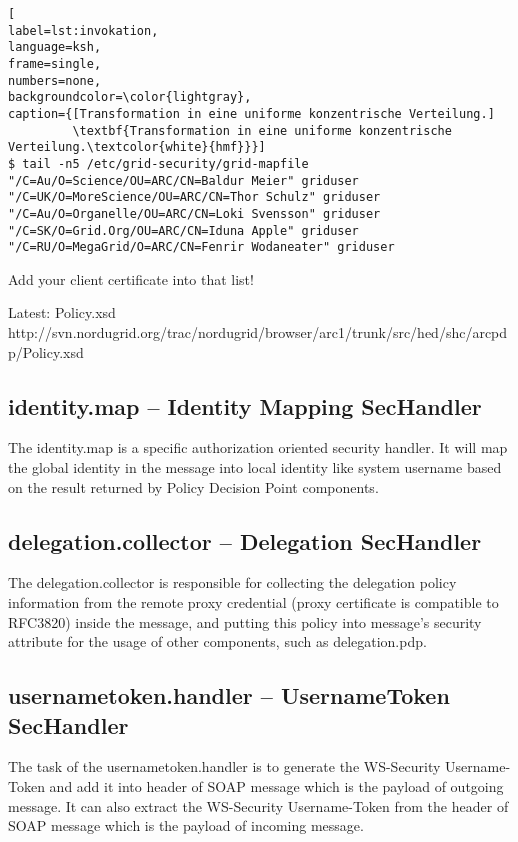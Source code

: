\begin{lstlisting}[
label=lst:invokation,
language=ksh,
frame=single,
numbers=none,
backgroundcolor=\color{lightgray},
caption={[Transformation in eine uniforme konzentrische Verteilung.]
         \textbf{Transformation in eine uniforme konzentrische Verteilung.\textcolor{white}{hmf}}}]
$ tail -n5 /etc/grid-security/grid-mapfile
"/C=Au/O=Science/OU=ARC/CN=Baldur Meier" griduser
"/C=UK/O=MoreScience/OU=ARC/CN=Thor Schulz" griduser
"/C=Au/O=Organelle/OU=ARC/CN=Loki Svensson" griduser
"/C=SK/O=Grid.Org/OU=ARC/CN=Iduna Apple" griduser
"/C=RU/O=MegaGrid/O=ARC/CN=Fenrir Wodaneater" griduser
\end{lstlisting}
Add your client certificate into that list!

Latest: Policy.xsd
http://svn.nordugrid.org/trac/nordugrid/browser/arc1/trunk/src/hed/shc/arcpdp/Policy.xsd


\subsection{identity.map – Identity Mapping SecHandler}

The identity.map is a specific authorization oriented security handler. It will map the global identity in
the message into local identity like system username based on the result returned by Policy Decision Point
components.


\subsection{delegation.collector – Delegation SecHandler}

The delegation.collector is responsible for collecting the delegation policy information from the remote
proxy credential (proxy certificate is compatible to RFC3820) inside the message, and putting this policy
into message’s security attribute for the usage of other components, such as delegation.pdp.


\subsection{ usernametoken.handler – UsernameToken SecHandler}

The task of the usernametoken.handler is to generate the WS-Security Username-Token and add it into
header of SOAP message which is the payload of outgoing message. It can also extract the WS-Security
Username-Token from the header of SOAP message which is the payload of incoming message.


